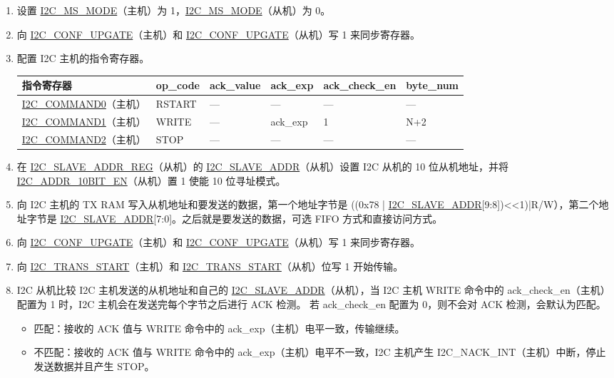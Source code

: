 \documentclass[main\_\_CN.tex]{subfiles}
\begin{document}
\begin{enumerate}
\item 设置 \hyperref[fielddesc:I2CMSMODE]{I2C\_MS\_MODE}（主机）为 1，\hyperref[fielddesc:I2CMSMODE]{I2C\_MS\_MODE}（从机）为 0。
\item 向 \hyperref[fielddesc:I2CCONFUPGATE]{I2C\_CONF\_UPGATE}（主机）和 \hyperref[fielddesc:I2CCONFUPGATE]{I2C\_CONF\_UPGATE}（从机）写 1 来同步寄存器。
\item 配置 I2C 主机的指令寄存器。

\begin{longtable}{ | p{4cm} | p{2cm} | p{2cm} | p{2cm} |p{2cm} | p{2cm} |}
\hline\rowcolor{lightgray}
指令寄存器& op\_code & ack\_value&ack\_exp&ack\_check\_en&byte\_num  \\ \hline
\hyperref[fielddesc:I2CCOMMAND0]{I2C\_COMMAND0}（主机）& RSTART& ---&---&---&---  \\ \hline
\hyperref[fielddesc:I2CCOMMAND1]{I2C\_COMMAND1}（主机）& WRITE& ---&ack\_exp&1&N+2  \\ \hline
\hyperref[fielddesc:I2CCOMMAND2]{I2C\_COMMAND2}（主机）& STOP& ---&---&---&---  \\ \hline
\end{longtable}

\item 在 \hyperref[regdesc:I2CSLAVEADDRREG]{I2C\_SLAVE\_ADDR\_REG}（从机）的 \hyperref[fielddesc:I2CSLAVEADDR]{I2C\_SLAVE\_ADDR}（从机）设置 I2C 从机的 10 位从机地址，并将 \hyperref[fielddesc:I2CADDR10BITEN]{I2C\_ADDR\_10BIT\_EN}（从机）置 1 使能 10 位寻址模式。
\item 向 I2C 主机的 TX RAM 写入从机地址和要发送的数据，第一个地址字节是 ((0x78 | \hyperref[fielddesc:I2CSLAVEADDR]{I2C\_SLAVE\_ADDR}[9:8])<<1)|R/W），第二个地址字节是 \hyperref[fielddesc:I2CSLAVEADDR]{I2C\_SLAVE\_ADDR}[7:0]。之后就是要发送的数据，可选 FIFO 方式和直接访问方式。
\item 向 \hyperref[fielddesc:I2CCONFUPGATE]{I2C\_CONF\_UPGATE}（主机）和 \hyperref[fielddesc:I2CCONFUPGATE]{I2C\_CONF\_UPGATE}（从机）写 1 来同步寄存器。
\item 向 \hyperref[fielddesc:I2CTRANSSTART]{I2C\_TRANS\_START}（主机）和 \hyperref[fielddesc:I2CTRANSSTART]{I2C\_TRANS\_START}（从机）位写 1 开始传输。
\item I2C 从机比较 I2C 主机发送的从机地址和自己的 \hyperref[fielddesc:I2CSLAVEADDR]{I2C\_SLAVE\_ADDR}（从机），当 I2C 主机 WRITE 命令中的 ack\_check\_en（主机）配置为 1 时，I2C 主机会在发送完每个字节之后进行 ACK 检测。 若 ack\_check\_en 配置为 0，则不会对 ACK 检测，会默认为匹配。
\begin{itemize}
\item 匹配：接收的 ACK 值与 WRITE 命令中的 ack\_exp（主机）电平一致，传输继续。
\item 不匹配：接收的 ACK 值与 WRITE 命令中的 ack\_exp（主机）电平不一致，I2C 主机产生 I2C\_NACK\_INT（主机）中断，停止发送数据并且产生 STOP。
\end{itemize}


\end{enumerate}
\end{document}
